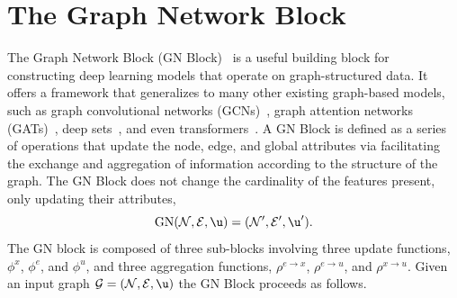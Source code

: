 \section{The Graph Network Block}
\label{sec:gn_block}

The Graph Network Block (GN Block)~\cite{RelationalInductiveBiases} is a useful building block for constructing deep learning models that operate on graph-structured data.
It offers a framework that generalizes to many other existing graph-based models, such as graph convolutional networks (GCNs)~\cite{GCN}, graph attention networks (GATs)~\cite{GraphAttentionNetworks}, deep sets~\cite{DeepSets}, and even transformers~\cite{Attention}.
A GN Block is defined as a series of operations that update the node, edge, and global attributes via facilitating the exchange and aggregation of information according to the structure of the graph.
The GN Block does not change the cardinality of the features present, only updating their attributes,
\begin{equation}
    \text{GN}(\mathcal{N}, \mathcal{E}, \u) = (\mathcal{N}', \mathcal{E}', \u').
\end{equation}
The GN block is composed of three sub-blocks involving three update functions, $\phi^x$, $\phi^e$, and $\phi^u$, and three aggregation functions, $\rho^{e \to x}$, $\rho^{e \to u}$, and $\rho^{x \to u}$.
Given an input graph $\mathcal{G} = (\mathcal{N}, \mathcal{E}, \u)$ the GN Block proceeds as follows.

